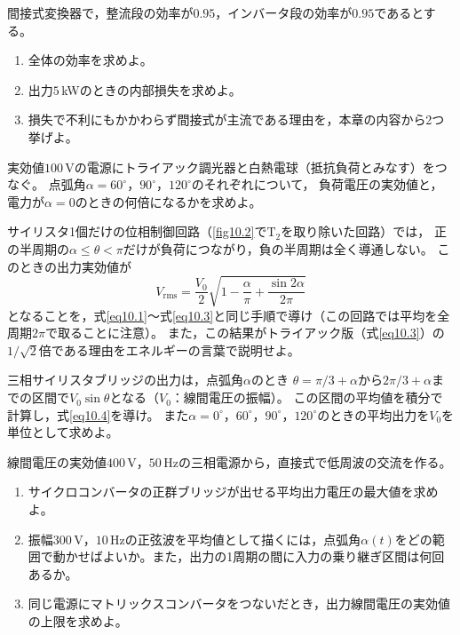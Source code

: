 \begin{章末問題}
\item \label{ex10.1}間接式変換器で，整流段の効率が$0.95$，インバータ段の効率が$0.95$であるとする。
\begin{enumerate}
\item[(a)] 全体の効率を求めよ。
\item[(b)] 出力$5$\,kWのときの内部損失を求めよ。
\item[(c)] 損失で不利にもかかわらず間接式が主流である理由を，本章の内容から2つ挙げよ。
\end{enumerate}

\item \label{ex10.2}実効値$100$\,Vの電源にトライアック調光器と白熱電球（抵抗負荷とみなす）をつなぐ。
点弧角$\alpha = 60^\circ$，$90^\circ$，$120^\circ$のそれぞれについて，
負荷電圧の実効値と，電力が$\alpha = 0$のときの何倍になるかを求めよ。

\item \label{ex10.3}サイリスタ1個だけの位相制御回路（\ref{fig10.2}で$\mathrm{T}_2$を取り除いた回路）では，
正の半周期の$\alpha \le \theta < \pi$だけが負荷につながり，負の半周期は全く導通しない。
このときの出力実効値が
\begin{equation*}
V_{\mathrm{rms}} = \frac{V_0}{2}
\sqrt{1 - \frac{\alpha}{\pi} + \frac{\sin 2\alpha}{2\pi}}
\end{equation*}
となることを，式\ref{eq10.1}〜式\ref{eq10.3}と同じ手順で導け（この回路では平均を全周期$2\pi$で取ることに注意）。
また，この結果がトライアック版（式\ref{eq10.3}）の$1/\sqrt{2}$倍である理由をエネルギーの言葉で説明せよ。

\item \label{ex10.4}三相サイリスタブリッジの出力は，点弧角$\alpha$のとき
$\theta = \pi/3 + \alpha$から$2\pi/3 + \alpha$までの区間で$V_0 \sin\theta$となる（$V_0$：線間電圧の振幅）。
この区間の平均値を積分で計算し，式\ref{eq10.4}を導け。
また$\alpha = 0^\circ$，$60^\circ$，$90^\circ$，$120^\circ$のときの平均出力を$V_0$を単位として求めよ。

\item \label{ex10.5}線間電圧の実効値$400$\,V，$50$\,Hzの三相電源から，直接式で低周波の交流を作る。
\begin{enumerate}
\item[(a)] サイクロコンバータの正群ブリッジが出せる平均出力電圧の最大値を求めよ。
\item[(b)] 振幅$300$\,V，$10$\,Hzの正弦波を平均値として描くには，点弧角$\alpha(t)$をどの範囲で動かせばよいか。また，出力の1周期の間に入力の乗り継ぎ区間は何回あるか。
\item[(c)] 同じ電源にマトリックスコンバータをつないだとき，出力線間電圧の実効値の上限を求めよ。
\end{enumerate}


\end{章末問題}
